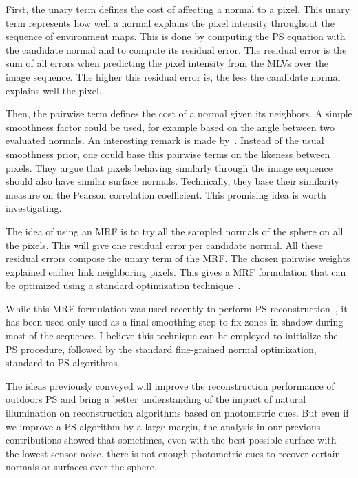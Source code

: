First, the unary term defines the cost of affecting a normal to a pixel. This unary term represents how well a normal explains the pixel intensity throughout the sequence of environment maps. This is done by computing the PS equation with the candidate normal and to compute its residual error. The residual error is the sum of all errors when predicting the pixel intensity from the MLVs over the image sequence. The higher this residual error is, the less the candidate normal explains well the pixel.

Then, the pairwise term defines the cost of a normal given its neighbors. A simple smoothness factor could be used, for example based on the angle between two evaluated normals. An interesting remark is made by~\cite{jung-cvpr-15}. Instead of the usual smoothness prior, one could base this pairwise terms on the likeness between pixels. They argue that pixels behaving similarly through the image sequence should also have similar surface normals. Technically, they base their similarity measure on the Pearson correlation coefficient. This promising idea is worth investigating.

The idea of using an MRF is to try all the sampled normals of the sphere on all the pixels. This will give one residual error per candidate normal. All these residual errors compose the unary term of the MRF. The chosen pairwise weights explained earlier link neighboring pixels. This gives a MRF formulation that can be optimized using a standard optimization technique~\cite{Boykov2001a,Kolmogorov2004a,Boykov2004,Bagon2006}.

While this MRF formulation was used recently to perform PS reconstruction~\cite{jung-cvpr-15}, it has been used only used as a final smoothing step to fix zones in shadow during most of the sequence. I believe this technique can be employed to initialize the PS procedure, followed by the standard fine-grained normal optimization, standard to PS algorithms.


The ideas previously conveyed will improve the reconstruction performance of outdoors PS and bring a better understanding of the impact of natural illumination on reconstruction algorithms based on photometric cues. But even if we improve a PS algorithm by a large margin, the analysis in our previous contributions showed that sometimes, even with the best possible surface with the lowest sensor noise, there is not enough photometric cues to recover certain normals or surfaces over the sphere.

